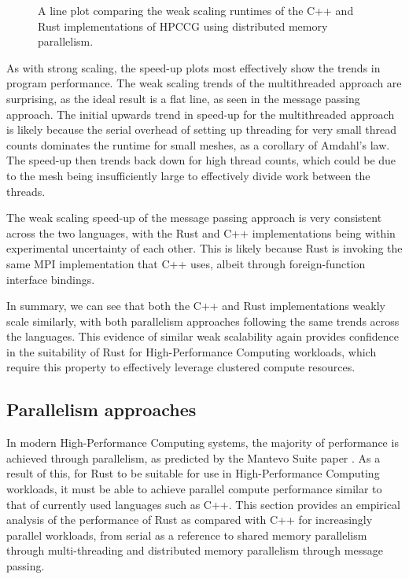 \begin{figure}[H]
    \centering
    
    \caption{A line plot comparing the weak scaling runtimes of the C++ and Rust implementations of HPCCG using distributed memory parallelism.}
    \label{fig:weak_scaling_speedup_mpi}
\end{figure}

As with strong scaling, the speed-up plots most effectively show the trends in program performance. The weak scaling trends of the multithreaded approach are surprising, as the ideal result is a flat line, as seen in the message passing approach. The initial upwards trend in speed-up for the multithreaded approach is likely because the serial overhead of setting up threading for very small thread counts dominates the runtime for small meshes, as a corollary of Amdahl's law. The speed-up then trends back down for high thread counts, which could be due to the mesh being insufficiently large to effectively divide work between the threads.

The weak scaling speed-up of the message passing approach is very consistent across the two languages, with the Rust and C++ implementations being within experimental uncertainty of each other. This is likely because Rust is invoking the same MPI implementation that C++ uses, albeit through foreign-function interface bindings.

In summary, we can see that both the C++ and Rust implementations weakly scale similarly, with both parallelism approaches following the same trends across the languages. This evidence of similar weak scalability again provides confidence in the suitability of Rust for High-Performance Computing workloads, which require this property to effectively leverage clustered compute resources.




\subsection{Parallelism approaches}
\label{ssec:parallelism-approaches}

In modern High-Performance Computing systems, the majority of performance is achieved through parallelism, as predicted by the Mantevo Suite paper \cite{heroux2013mantevo}. As a result of this, for Rust to be suitable for use in High-Performance Computing workloads, it must be able to achieve parallel compute performance similar to that of currently used languages such as C++. This section provides an empirical analysis of the performance of Rust as compared with C++ for increasingly parallel workloads, from serial as a reference to shared memory parallelism through multi-threading and distributed memory parallelism through message passing.

